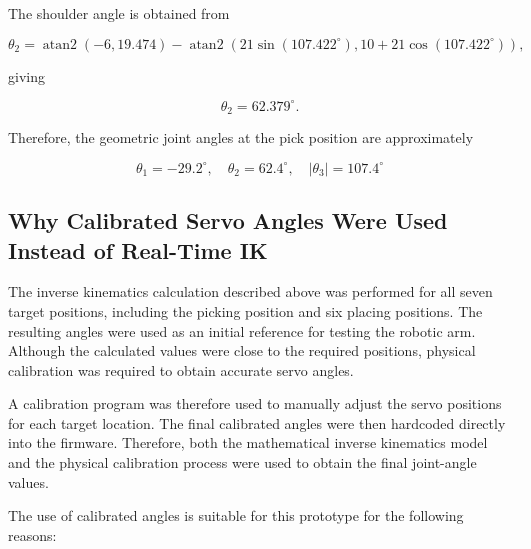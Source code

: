 The shoulder angle is obtained from

\begin{equation}
\theta_2 =
\operatorname{atan2}(-6,19.474)
-
\operatorname{atan2}
\left(
21\sin(107.422^\circ),
10+21\cos(107.422^\circ)
\right),
\end{equation}

giving

\begin{equation}
\theta_2=62.379^\circ.
\end{equation}

Therefore, the geometric joint angles at the pick position are approximately

\begin{equation}
\boxed{
\theta_1=-29.2^\circ,\quad
\theta_2=62.4^\circ,\quad
|\theta_3|=107.4^\circ
}
\end{equation}

\subsection{Why Calibrated Servo Angles Were Used Instead of Real-Time IK}

The inverse kinematics calculation described above was performed for all seven target positions, including the picking position and six placing positions. The resulting angles were used as an initial reference for testing the robotic arm. Although the calculated values were close to the required positions, physical calibration was required to obtain accurate servo angles.

A calibration program was therefore used to manually adjust the servo positions for each target location. The final calibrated angles were then hardcoded directly into the firmware. Therefore, both the mathematical inverse kinematics model and the physical calibration process were used to obtain the final joint-angle values.

The use of calibrated angles is suitable for this prototype for the following reasons:

